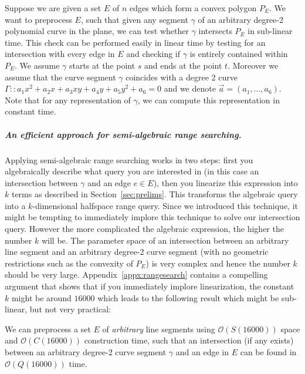 \documentclass[a4paper, UKenglish]{lipics-v2018}
\begin{document}
Suppose we are given a set $E$ of $n$ edges which form a convex polygon $P_E$. We want to preprocess $E$, such that given any segment $\gamma$ of an arbitrary degree-2 polynomial curve in the plane, we can test whether $\gamma$ intersects $P_E$ in sub-linear time. This check can be performed easily in linear time by testing for an intersection with every edge in $E$ and checking if $\gamma$ is entirely contained within $P_E$. We assume $\gamma$ starts at the point $s$ and ends at the point $t$. Moreover we assume that the curve segment $\gamma$ coincides with a degree 2 curve $\Gamma :: a_1 x^2 + a_2 x + a_3 xy + a_4 y + a_5 y^2 + a_6 = 0$ and we denote $\vec{a} = (a_1, \ldots, a_6)$. Note that for any representation of $\gamma$, we can compute this representation in constant time.

\subparagraph*{An efficient approach for semi-algebraic range searching.}
Applying semi-algebraic range searching works in two steps: first you algebraically describe what query you are interested in (in this case an intersection between $\gamma$ and an edge $e \in E$), then you linearize this expression into $k$ terms as described in Section~\ref{sec:prelims}. This transforms the algebraic query into a $k$-dimensional halfspace range query. Since we introduced this technique, it might be tempting to immediately implore this technique to solve our intersection query. However the more complicated the algebraic expression, the higher the number $k$ will be. The parameter space of an intersection between an arbitrary line segment and an arbitrary degree-2 curve segment (with no geometric restrictions such as the convexity of $P_E$) is very complex and hence the number $k$ should be very large. Appendix~\ref{appx:rangesearch} contains a compelling argument that shows that if you immediately implore linearization, the constant $k$ might be around $16000$ which leads to the following result which might be sub-linear, but not very practical:

\begin{lemma}
We can preprocess a set $E$ of \emph{arbitrary} line segments using $\mathcal{O}(S(16000))$ space and $\mathcal{O}(C(16000))$ construction time, such that an intersection (if any exists) between an arbitrary degree-2 curve segment $\gamma$ and an edge in $E$ can be found in $\mathcal{O}(Q(16000))$ time.
\end{lemma}
\end{document}
